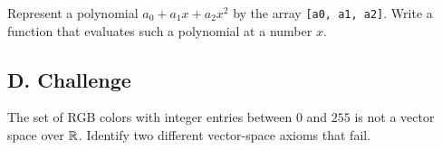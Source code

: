 \begin{exercise}
Represent a polynomial $a_0+a_1x+a_2x^2$ by the array
\texttt{[a0, a1, a2]}. Write a function that evaluates such a polynomial at a
number $x$.
\end{exercise}

\subsection*{D. Challenge}

\begin{exercise}
The set of RGB colors with integer entries between $0$ and $255$ is not a
vector space over $\mathbb{R}$. Identify two different vector-space axioms that fail.
\end{exercise}
